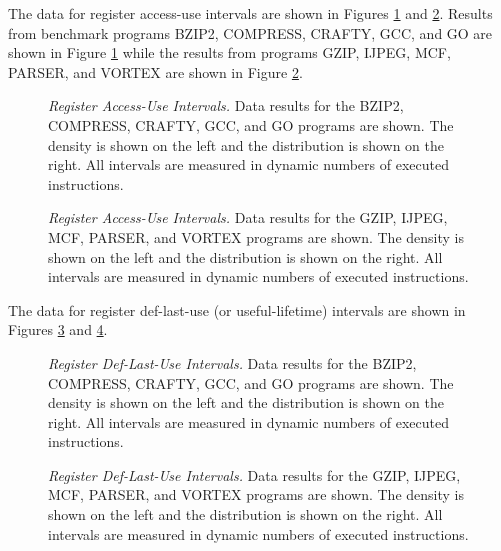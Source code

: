 %
The data for register access-use intervals are
shown in Figures \ref{fig:aa_rrint} 
and \ref{fig:ab_rrint}.
Results from benchmark programs BZIP2, COMPRESS, CRAFTY, GCC, and GO
are shown in Figure \ref{fig:aa_rrint} while the results
from programs GZIP, IJPEG, MCF, PARSER, and VORTEX are shown in
Figure \ref{fig:ab_rrint}.
%
\begin{figure}
\centering
{}
\caption{{\em Register Access-Use Intervals.} 
Data results for the 
BZIP2, COMPRESS, CRAFTY, GCC, and GO programs are shown.
The density is shown on the left and the distribution is shown
on the right.
All intervals are measured in dynamic numbers of executed instructions.}
\label{fig:aa_rrint}
\end{figure}
%
\begin{figure}
\centering
{}
\caption{{\em Register Access-Use Intervals.} 
Data results for the
GZIP, IJPEG, MCF, PARSER, and VORTEX programs are shown.
The density is shown on the left and the distribution is shown
on the right.
All intervals are measured in dynamic numbers of executed instructions.}
\label{fig:ab_rrint}
\end{figure}
%
%

The data for register def-last-use (or useful-lifetime) intervals are
shown in Figures \ref{fig:aa_rlife} 
and \ref{fig:ab_rlife}.
%
\begin{figure}
\centering
{}
\caption{{\em Register Def-Last-Use Intervals.} 
Data results for the 
BZIP2, COMPRESS, CRAFTY, GCC, and GO programs are shown.
The density is shown on the left and the distribution is shown
on the right.
All intervals are measured in dynamic numbers of executed instructions.}
\label{fig:aa_rlife}
\end{figure}
%
\begin{figure}
\centering
{}
\caption{{\em Register Def-Last-Use Intervals.} 
Data results for the
GZIP, IJPEG, MCF, PARSER, and VORTEX programs are shown.
The density is shown on the left and the distribution is shown
on the right.
All intervals are measured in dynamic numbers of executed instructions.}
\label{fig:ab_rlife}
\end{figure}
%
%

